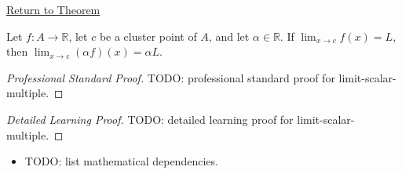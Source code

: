\newpage
{}
\label{prf:limit-scalar-multiple}

\begin{remark*}[Return]
\hyperref[thm:limit-scalar-multiple]{Return to Theorem}
\end{remark*}

\begin{theorem*}
Let $f : A \to \mathbb{R}$, let $c$ be a cluster point of $A$, and let
$\alpha \in \mathbb{R}$. If $\lim_{x\to c}f(x)=L$, then
$\lim_{x\to c}(\alpha f)(x) = \alpha L$.
\end{theorem*}

\begin{proof}[Professional Standard Proof]
\LRAProofBodyStart
TODO: professional standard proof for limit-scalar-multiple.
\end{proof}

\begin{proof}[Detailed Learning Proof]
\LRAProofBodyStart
TODO: detailed learning proof for limit-scalar-multiple.
\end{proof}

\begin{remark*}
\end{remark*}

\begin{dependencies}
\begin{itemize}
  \item TODO: list mathematical dependencies.
\end{itemize}
\end{dependencies}

\clearpage
